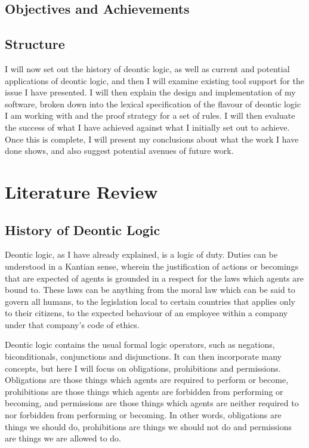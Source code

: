 \documentclass{l4proj}
\begin{document}
\section{Objectives and Achievements}

\section{Structure}
I will now set out the history of deontic logic, as well as current and potential applications of deontic logic, and then I will examine existing tool support for the issue I have presented. I will then explain the design and implementation of my software, broken down into the lexical specification of the flavour of deontic logic I am working with and the proof strategy for a set of rules. I will then evaluate the success of what I have achieved against what I initially set out to achieve. Once this is complete, I will present my conclusions about what the work I have done shows, and also suggest potential avenues of future work. 

\chapter{Literature Review}

\section{History of Deontic Logic}
Deontic logic, as I have already explained, is a logic of duty. Duties can be understood in a Kantian sense, wherein the justification of actions or becomings that are expected of agents is grounded in a respect for the laws which agents are bound to\citep{sep-kant-moral}. These laws can be anything from the moral law which can be said to govern all humans, to the legislation local to certain countries that applies only to their citizens, to the expected behaviour of an employee within a company under that company's code of ethics. 

Deontic logic contains the usual formal logic operators, such as negations, biconditionals, conjunctions and disjunctions. It can then incorporate many concepts, but here I will focus on obligations, prohibitions and permissions. Obligations are those things which agents are required to perform or become, prohibitions are those things which agents are forbidden from performing or becoming, and permissions are those things which agents are neither required to nor forbidden from performing or becoming. In other words, obligations are things we should do, prohibitions are things we should not do and permissions are things we are allowed to do. 
\end{document}
